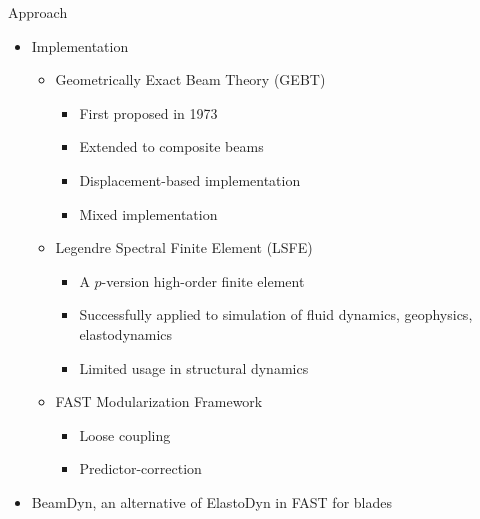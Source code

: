 \documentclass[xcolor=cmyk]{beamer}
\begin{document}
\begin{frame}{Approach}
  \begin{itemize}
    \item
    Implementation
    \begin{itemize}
      \item
      Geometrically Exact Beam Theory (GEBT) 
      \begin{itemize}
        \item
        \pause
        First proposed in 1973 \citep{Ressiner1973}
        \item
        \pause
        Extended to composite beams \citep{HodgesBeamBook}
        \item
        \pause
        Displacement-based implementation \citep{Bottasso:1998,Dymore:2013}
        \item
        \pause
        Mixed implementation \citep{YuGEBT,Wang:GEBT2013}
      \end{itemize}
      \item
      Legendre Spectral Finite Element (LSFE) \citep{Patera:1984}
      \begin{itemize}
          \item
          \pause
          A $p$-version high-order finite element 
          \item
          \pause
          Successfully applied to simulation of fluid dynamics, geophysics, elastodynamics
          \item
          \pause
          Limited usage in structural dynamics
      \end{itemize}
      \item
      FAST Modularization Framework \citep{Jonkman:2013,Sprague:2015}
      \begin{itemize}
          \item Loose coupling
          \item Predictor-correction          
      \end{itemize}
    \end{itemize}
    \item
    BeamDyn, an alternative of ElastoDyn in FAST for blades
  \end{itemize}
\end{frame}
\end{document}
